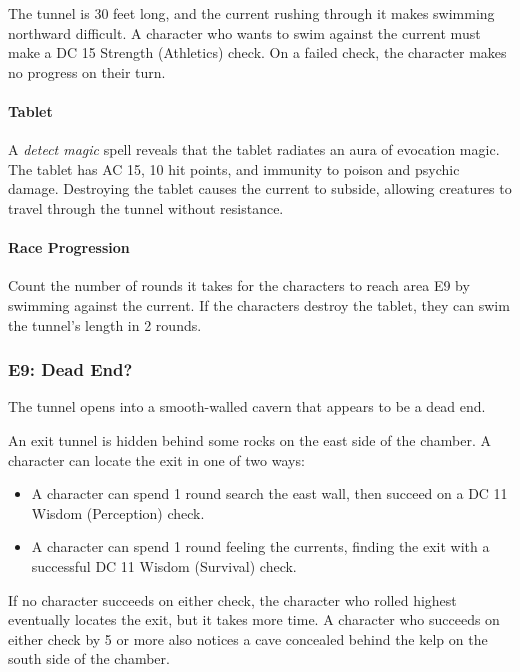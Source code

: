 \documentclass[a4paper, 11pt, bg=full, twocolumn, nooutline]{dndbook}
\begin{document}
The tunnel is 30 feet long, and the current rushing through it makes swimming northward difficult. A character who wants to swim against the current must make a DC 15 Strength (Athletics) check. On a failed check, the character makes no progress on their turn.

\paragraph{Tablet}

A \textit{detect magic} spell reveals that the tablet radiates an aura of evocation magic. The tablet has AC 15, 10 hit points, and immunity to poison and psychic damage. Destroying the tablet causes the current to subside, allowing creatures to travel through the tunnel without resistance.

\paragraph{Race Progression}

Count the number of rounds it takes for the characters to reach area E9 by swimming against the current. If the characters destroy the tablet, they can swim the tunnel's length in 2 rounds.

\subsubsection{E9: Dead End?}

\begin{DndReadAloud}
The tunnel opens into a smooth-walled cavern that appears to be a dead end.
\end{DndReadAloud}

An exit tunnel is hidden behind some rocks on the east side of the chamber. A character can locate the exit in one of two ways:

\begin{itemize}
\item A character can spend 1 round search the east wall, then succeed on a DC 11 Wisdom (Perception) check.
\item A character can spend 1 round feeling the currents, finding the exit with a successful DC 11 Wisdom (Survival) check.
\end{itemize}

If no character succeeds on either check, the character who rolled highest eventually locates the exit, but it takes more time. A character who succeeds on either check by 5 or more also notices a cave concealed behind the kelp on the south side of the chamber.
\end{document}
